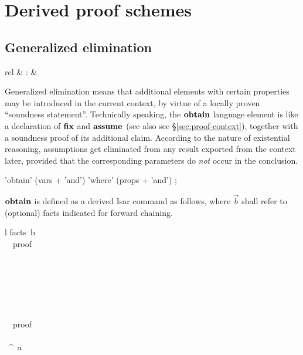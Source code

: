 \section{Derived proof schemes}

\subsection{Generalized elimination}\label{sec:obtain}

\begin{matharray}{rcl}
   & : &  \\
\end{matharray}

Generalized elimination means that additional elements with certain properties
may be introduced in the current context, by virtue of a locally proven
``soundness statement''.  Technically speaking, the ${\mathord{\mathbf{obtain}}}$ language
element is like a declaration of ${\mathord{\mathbf{fix}}}$ and ${\mathord{\mathbf{assume}}}$ (see also see
\S\ref{sec:proof-context}), together with a soundness proof of its additional
claim.  According to the nature of existential reasoning, assumptions get
eliminated from any result exported from the context later, provided that the
corresponding parameters do \emph{not} occur in the conclusion.

\begin{rail}
  'obtain' (vars + 'and') 'where' (props + 'and')
  ;
\end{rail}

${\mathord{\mathbf{obtain}}}$ is defined as a derived Isar command as follows, where $\vec b$
shall refer to (optional) facts indicated for forward chaining.
\begin{matharray}{l}
  \langle facts~\vec b\rangle \\
  ~~\langle proof\rangle \equiv {} \\[1ex]
  \quad {} \\
  \quad {} \\
  \qquad {} \\
  \qquad {} \\
  \qquad {} \\
  \quad\qquad \APPLY{-} \\
  \quad\qquad {}~~\langle proof\rangle \\
  \quad \QED{} \\
  \quad {}~\ASSUMENAME^\ast~a\colon~\vec\phi \\
\end{matharray}

